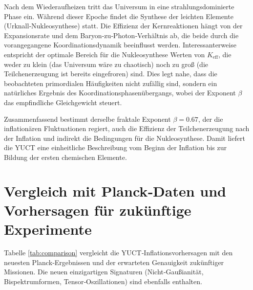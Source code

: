 \documentclass[11pt,a4paper]{article}
\newcommand{\Keff}{K_{\mathrm{eff}}}
\begin{document}
	Nach dem Wiederaufheizen tritt das Universum in eine strahlungsdominierte Phase ein. Während dieser Epoche findet die Synthese der leichten Elemente (Urknall‑Nukleosynthese) statt. Die Effizienz der Kernreaktionen hängt von der Expansionsrate und dem Baryon‑zu‑Photon‑Verhältnis ab, die beide durch die vorangegangene Koordinationsdynamik beeinflusst werden. Interessanterweise entspricht der optimale Bereich für die Nukleosynthese Werten von \(\Keff\), die weder zu klein (das Universum wäre zu chaotisch) noch zu groß (die Teilchenerzeugung ist bereits eingefroren) sind. Dies legt nahe, dass die beobachteten primordialen Häufigkeiten nicht zufällig sind, sondern ein natürliches Ergebnis des Koordinationsphasenübergangs, wobei der Exponent \(\beta\) das empfindliche Gleichgewicht steuert.
	
	Zusammenfassend bestimmt derselbe fraktale Exponent \(\beta = 0.67\), der die inflationären Fluktuationen regiert, auch die Effizienz der Teilchenerzeugung nach der Inflation und indirekt die Bedingungen für die Nukleosynthese. Damit liefert die YUCT eine einheitliche Beschreibung vom Beginn der Inflation bis zur Bildung der ersten chemischen Elemente.
	
	\section{Vergleich mit Planck‑Daten und Vorhersagen für zukünftige Experimente}
	\label{sec:comparison}
	
	Tabelle \ref{tab:comparison} vergleicht die YUCT‑Inflationsvorhersagen mit den neuesten Planck‑Ergebnissen und der erwarteten Genauigkeit zukünftiger Missionen. Die neuen einzigartigen Signaturen (Nicht‑Gaußianität, Bispektrumformen, Tensor‑Oszillationen) sind ebenfalls enthalten.
	
\end{document}
